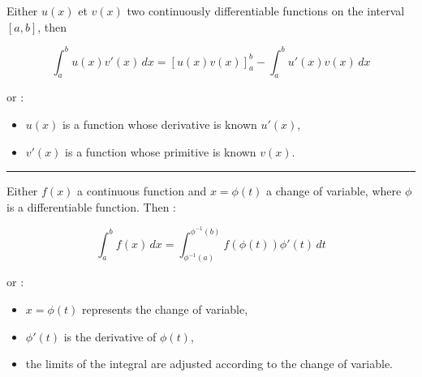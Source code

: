 \begin{f}  

Either \( u(x) \) et \( v(x) \) two continuously differentiable functions on the interval \([a, b]\), then

\[
\int_a^b u(x) v'(x) \, dx = \left[ u(x) v(x) \right]_a^b - \int_a^b u'(x) v(x) \, dx
\]

or :
\begin{itemize}
    \item \( u(x) \) is a function whose derivative is known \( u'(x) \),
    \item \( v'(x) \) is a function whose primitive is known \( v(x) \).
\end{itemize}

\end{f}
\hrule
\begin{f} 

Either \( f(x) \) a continuous function and \( x = \phi(t) \) a change of variable, where \( \phi \) is a differentiable function. Then :

\[
\int_{a}^{b} f(x) \, dx = \int_{\phi^{-1}(a)}^{\phi^{-1}(b)} f(\phi(t)) \phi'(t) \, dt
\]

or :
\begin{itemize}
    \item \( x = \phi(t) \) represents the change of variable,
    \item \( \phi'(t) \) is the derivative of \( \phi(t) \),
    \item the limits of the integral are adjusted according to the change of variable.
\end{itemize}
\end{f}


